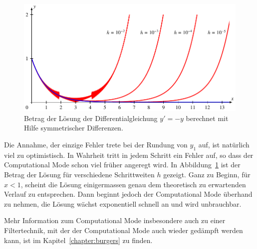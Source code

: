 \begin{figure}
\centering
\includegraphics{chapters/70-pde/experiments/computationalmode.pdf}
\caption{Betrag der Lösung der Differentialgleichung $y'=-y$ berechnet
mit Hilfe symmetrischer Differenzen.
\label{buch:pde:cm:fig}}
\end{figure}
Die Annahme, der einzige Fehler trete bei der Rundung von $y_1$ auf,
ist natürlich viel zu optimistisch.
In Wahrheit tritt in jedem Schritt ein Fehler auf, so dass der 
Computational Mode schon viel früher angeregt wird.
In Abbildung~\ref{buch:pde:cm:fig} ist der Betrag der Lösung
für verschiedene Schrittweiten $h$ gezeigt.
Ganz zu Beginn, für $x<1$, scheint die Lösung einigermassen genau dem
theoretisch zu erwartenden Verlauf zu entsprechen.
Dann beginnt jedoch der Computational Mode überhand zu nehmen,
die Lösung wächst exponentiell schnell an und wird unbrauchbar.
%

Mehr Information zum Computational Mode insbesondere auch zu einer
Filtertechnik, mit der der Computational Mode auch wieder gedämpft
werden kann, ist im Kapitel~\ref{chapter:burgers} zu finden.
%
%






